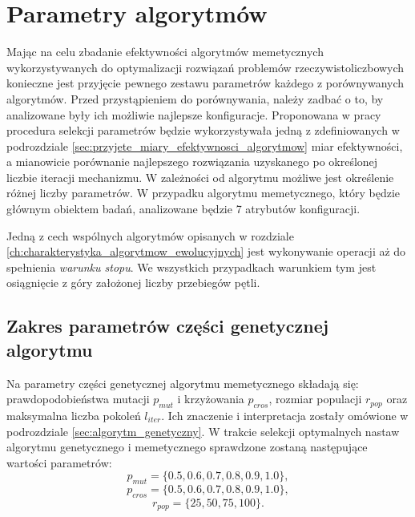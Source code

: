 \section{Parametry algorytmów}
\label{sec:parametry_algorytmow}
\par
Mając na celu zbadanie efektywności algorytmów memetycznych wykorzystywanych do optymalizacji rozwiązań problemów rzeczywistoliczbowych konieczne jest przyjęcie pewnego zestawu parametrów każdego z porównywanych algorytmów. Przed przystąpieniem do porównywania, należy zadbać o to, by analizowane były ich możliwie najlepsze konfiguracje. Proponowana w pracy procedura selekcji parametrów będzie wykorzystywała jedną z zdefiniowanych w podrozdziale \ref{sec:przyjete_miary_efektywnosci_algorytmow} miar efektywności, a mianowicie porównanie najlepszego rozwiązania uzyskanego po określonej liczbie iteracji mechanizmu. W zależności od algorytmu możliwe jest określenie różnej liczby parametrów. W przypadku algorytmu memetycznego, który będzie głównym obiektem badań, analizowane będzie 7 atrybutów konfiguracji.
\par
Jedną z cech wspólnych algorytmów opisanych w rozdziale \ref{ch:charakterystyka_algorytmow_ewolucyjnych} jest wykonywanie operacji aż do spełnienia \emph{warunku stopu}. We wszystkich przypadkach warunkiem tym jest osiągnięcie z góry założonej liczby przebiegów pętli. 
\subsection{Zakres parametrów części genetycznej algorytmu}
%
Na parametry części genetycznej algorytmu memetycznego składają się: prawdopodobieństwa mutacji $p_{mut}$ i krzyżowania $p_{cros}$, rozmiar populacji $r_{pop}$ oraz maksymalna liczba pokoleń $l_{iter}$. Ich znaczenie i interpretacja zostały omówione w podrozdziale \ref{sec:algorytm_genetyczny}. W trakcie selekcji optymalnych nastaw algorytmu genetycznego i memetycznego sprawdzone zostaną następujące wartości parametrów:
\[p_{mut} = \lbrace0.5, 0.6, 0.7, 0.8, 0.9, 1.0\rbrace,\]
\[p_{cros} = \lbrace0.5, 0.6, 0.7, 0.8, 0.9, 1.0\rbrace,\]
\[r_{pop}=\lbrace25, 50, 75, 100\rbrace.\]

